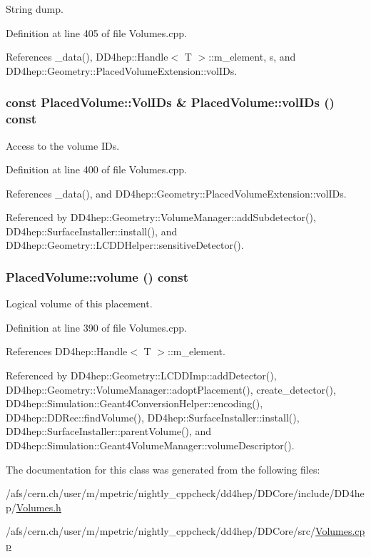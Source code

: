 String dump. 

Definition at line 405 of file Volumes.cpp.

References \_\-data(), DD4hep::Handle$<$ T $>$::m\_\-element, s, and DD4hep::Geometry::PlacedVolumeExtension::volIDs.\hypertarget{class_d_d4hep_1_1_geometry_1_1_placed_volume_af7478d475c0719d37ebadc8d18ba12ba}{
\subsubsection[{volIDs}]{\setlength{\rightskip}{0pt plus 5cm}const {\bf PlacedVolume::VolIDs} \& PlacedVolume::volIDs () const}}
\label{class_d_d4hep_1_1_geometry_1_1_placed_volume_af7478d475c0719d37ebadc8d18ba12ba}


Access to the volume IDs. 

Definition at line 400 of file Volumes.cpp.

References \_\-data(), and DD4hep::Geometry::PlacedVolumeExtension::volIDs.

Referenced by DD4hep::Geometry::VolumeManager::addSubdetector(), DD4hep::SurfaceInstaller::install(), and DD4hep::Geometry::LCDDHelper::sensitiveDetector().\hypertarget{class_d_d4hep_1_1_geometry_1_1_placed_volume_a7896af4481e228014289900a8943a7da}{
\subsubsection[{volume}]{ PlacedVolume::volume () const}}
\label{class_d_d4hep_1_1_geometry_1_1_placed_volume_a7896af4481e228014289900a8943a7da}


Logical volume of this placement. 

Definition at line 390 of file Volumes.cpp.

References DD4hep::Handle$<$ T $>$::m\_\-element.

Referenced by DD4hep::Geometry::LCDDImp::addDetector(), DD4hep::Geometry::VolumeManager::adoptPlacement(), create\_\-detector(), DD4hep::Simulation::Geant4ConversionHelper::encoding(), DD4hep::DDRec::findVolume(), DD4hep::SurfaceInstaller::install(), DD4hep::SurfaceInstaller::parentVolume(), and DD4hep::Simulation::Geant4VolumeManager::volumeDescriptor().

The documentation for this class was generated from the following files:\begin{DoxyCompactItemize}
\item 
/afs/cern.ch/user/m/mpetric/nightly\_\-cppcheck/dd4hep/DDCore/include/DD4hep/\hyperlink{_volumes_8h}{Volumes.h}\item 
/afs/cern.ch/user/m/mpetric/nightly\_\-cppcheck/dd4hep/DDCore/src/\hyperlink{_volumes_8cpp}{Volumes.cpp}\end{DoxyCompactItemize}
